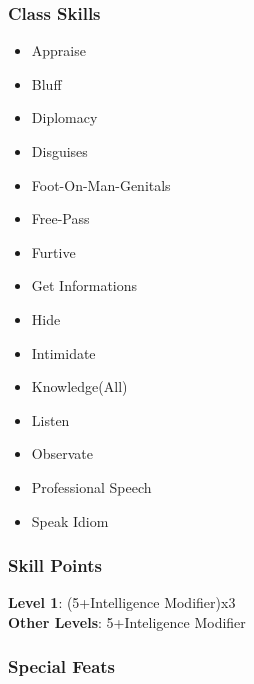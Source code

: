 \documentclass[ letterpaper,12pt]{article}
\begin{document}
\subsubsection{Class Skills}
\begin{itemize}
   \item{Appraise}
   \item{Bluff}
   \item{Diplomacy}
   \item{Disguises}
   \item{Foot-On-Man-Genitals}
   \item{Free-Pass}
   \item{Furtive}
   \item{Get Informations}
   \item{Hide}
   \item{Intimidate}
   \item{Knowledge(All)}
   \item{Listen}
   \item{Observate}
   \item{Professional Speech}
   \item{Speak Idiom}
\end{itemize}

\subsubsection{Skill Points}
{\bf Level 1}: (5+Intelligence Modifier)x3\\
{\bf Other Levels}: 5+Inteligence Modifier\\

\subsubsection{Special Feats}
\end{document}
